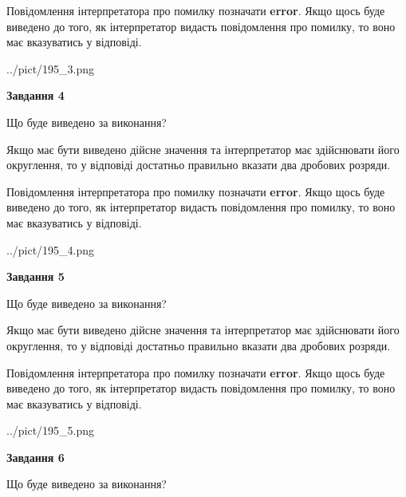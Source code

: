 \documentclass[12pt, ukrainian]{article}
\begin{document}
{\begin {Large}
Повідомлення інтерпретатора про помилку позначати \textbf{error}.
Якщо щось буде виведено до того, як інтерпретатор видасть повідомлення про помилку, 
то воно має вказуватись у відповіді. \par

\begin{center}
	{../pict/195_3.png}
\end{center}
\newpage

{\begin {center}\textbf{Завдання 4}\end {center}}\par
Що буде виведено за виконання? \par

Якщо має бути виведено дійсне значення та інтерпретатор має здійснювати його округлення, 
то у відповіді достатньо правильно вказати два дробових розряди.

Повідомлення інтерпретатора про помилку позначати \textbf{error}.
Якщо щось буде виведено до того, як інтерпретатор видасть повідомлення про помилку, 
то воно має вказуватись у відповіді. \par

\begin{center}
	{../pict/195_4.png}
\end{center}
\newpage

{\begin {center}\textbf{Завдання 5}\end {center}}\par
Що буде виведено за виконання? \par

Якщо має бути виведено дійсне значення та інтерпретатор має здійснювати його округлення, 
то у відповіді достатньо правильно вказати два дробових розряди.

Повідомлення інтерпретатора про помилку позначати \textbf{error}.
Якщо щось буде виведено до того, як інтерпретатор видасть повідомлення про помилку, 
то воно має вказуватись у відповіді. \par

\begin{center}
	{../pict/195_5.png}
\end{center}
\newpage

{\begin {center}\textbf{Завдання 6}\end {center}}\par
Що буде виведено за виконання? \par


\end{Large}}
\end{document}
